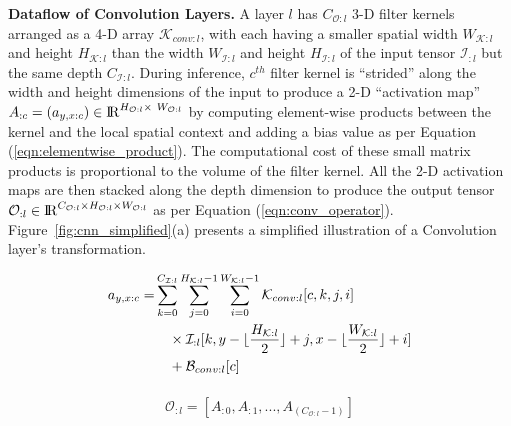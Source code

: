 \vspace{2mm}
\noindent \textbf{Dataflow of Convolution Layers.} 
A layer $l$ has $C_{\mathcal{O}:l}$ 3-D filter kernels arranged as a 4-D array $\mathcal{K}_{conv:l}$, with each having a smaller spatial width $W_{\mathcal{K}:l}$ and height $H_{\mathcal{K}:l}$ than the width $W_{\mathcal{I}:l}$ and height $H_{\mathcal{I}:l}$ of the input tensor $\mathcal{I}_{:l}$ but the same depth $C_{\mathcal{I}:l}$. During inference, $c^{th}$ filter kernel is ``strided'' along the width and height dimensions of the input to produce a 2-D ``activation map'' $A_{:c}=(a_{y,x:c})\in \mathcal{\rm I\!R}^{H_{\mathcal{O}:l} \times~ W_{\mathcal{O}:l}}$ by computing element-wise products between the kernel and the local spatial context and adding a bias value as per Equation (\ref{eqn:elementwise_product}). The computational cost of these small matrix products is proportional to the volume of the filter kernel. All the 2-D activation maps are then stacked along the depth dimension to produce the output tensor $\mathcal{O}_{:l} \in \mathcal{\rm I\!R}^{C_{\mathcal{O}:l} \times H_{\mathcal{O}:l} \times W_{\mathcal{O}:l}}$ as per Equation (\ref{eqn:conv_operator}). Figure~\ref{fig:cnn_simplified}(a) presents a simplified illustration of a Convolution layer's transformation.


\begin{align}
\label{eqn:elementwise_product}
\begin{split}
a_{y,x:c} =& \sum_{k=0}^{C_{\mathcal{I}:l} } \sum_{j=0}^{H_{\mathcal{K}:l}-1} \sum_{i=0}^{W_{\mathcal{K}:l}-1} \mathcal{K}_{conv:l}[c, k, j, i] \\
& \quad \times \mathcal{I}_{:l}[k,y-\lfloor\frac{H_{\mathcal{K}:l} }{2}\rfloor+j,x-\lfloor\frac{W_{\mathcal{K}:l} }{2}\rfloor+i] \\
& \quad + \mathcal{B}_{conv:l}[c]
\end{split}
\end{align}

\begin{align}
\label{eqn:conv_operator}
\begin{split}
\mathcal{O}_{:l} = [A_{:0}, A_{:1}, ... , A_{(C_{\mathcal{O}:l}-1)}]
\end{split}
\end{align}



